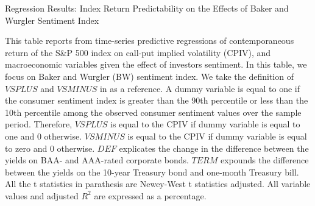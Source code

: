 \begin{table}[h]

\caption{Regression Results: Index Return Predictability on the Effects of Baker and Wurgler Sentiment Index}\label{table:BW_sentiment}
\begin{threeparttable}


\medskip
\begin{spacing}{1.1}
{\footnotesize 
This table reports from time-series predictive regressions of contemporaneous return of the S\&P 500 index on call-put implied volatility (CPIV), and macroeconomic variables given the effect of investors sentiment. In this table, we focus on Baker and Wurgler (BW) sentiment index. We take the definition of $VSPLUS$ and $VSMINUS$ in \textcite{atilgan2015implied} as a reference. A dummy variable is equal to one if the consumer sentiment index is greater than the 90th percentile or less than the 10th percentile among the observed consumer sentiment values over the sample period. Therefore, $VSPLUS$ is equal to the CPIV if dummy variable is equal to one and 0 otherwise. $VSMINUS$ is equal to the CPIV if dummy variable is equal to zero and 0 otherwise. $DEF$ explicates the change in the difference between the yields on BAA- and AAA-rated corporate bonds. $TERM$ expounds the difference between the yields on the 10-year Treasury bond and one-month Treasury bill. All the t statistics in parathesis are Newey-West t statistics adjusted. All variable values and adjusted $R^{2}$ are expressed as a percentage.      
}
\end{spacing}
\medskip
\bigskip
\footnotesize



\end{threeparttable}
\end{table}
